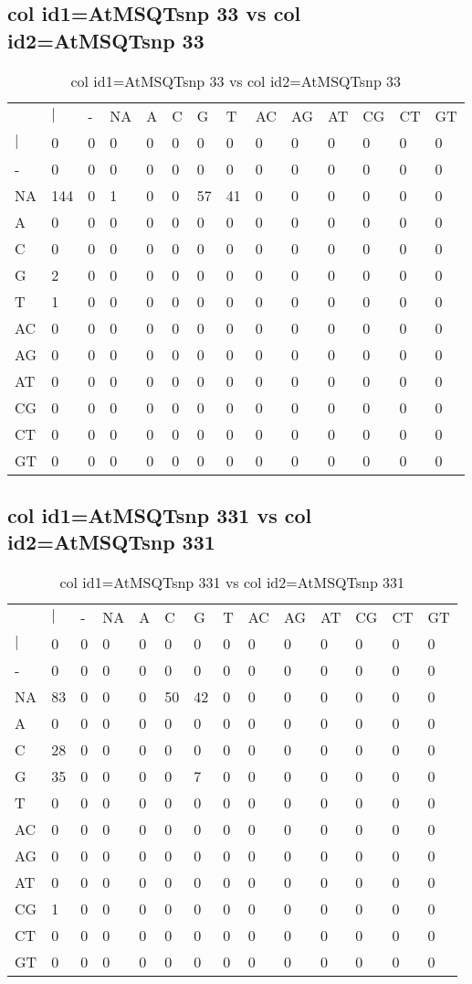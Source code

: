 \subsection{col id1=AtMSQTsnp 33 vs col id2=AtMSQTsnp 33}
\begin{center}
\begin{longtable}{|l|l|l|l|l|l|l|l|l|l|l|l|l|l|}
\caption{col id1=AtMSQTsnp 33 vs col id2=AtMSQTsnp 33} \label{table_dm670}\\
\hline
\\
\hline
&$|$&-&NA&A&C&G&T&AC&AG&AT&CG&CT&GT\\
$|$&0&0&0&0&0&0&0&0&0&0&0&0&0\\
-&0&0&0&0&0&0&0&0&0&0&0&0&0\\
NA&144&0&1&0&0&57&41&0&0&0&0&0&0\\
A&0&0&0&0&0&0&0&0&0&0&0&0&0\\
C&0&0&0&0&0&0&0&0&0&0&0&0&0\\
G&2&0&0&0&0&0&0&0&0&0&0&0&0\\
T&1&0&0&0&0&0&0&0&0&0&0&0&0\\
AC&0&0&0&0&0&0&0&0&0&0&0&0&0\\
AG&0&0&0&0&0&0&0&0&0&0&0&0&0\\
AT&0&0&0&0&0&0&0&0&0&0&0&0&0\\
CG&0&0&0&0&0&0&0&0&0&0&0&0&0\\
CT&0&0&0&0&0&0&0&0&0&0&0&0&0\\
GT&0&0&0&0&0&0&0&0&0&0&0&0&0\\
\hline
\end{longtable}
\end{center}

\subsection{col id1=AtMSQTsnp 331 vs col id2=AtMSQTsnp 331}
\begin{center}
\begin{longtable}{|l|l|l|l|l|l|l|l|l|l|l|l|l|l|}
\caption{col id1=AtMSQTsnp 331 vs col id2=AtMSQTsnp 331} \label{table_dm672}\\
\hline
\\
\hline
&$|$&-&NA&A&C&G&T&AC&AG&AT&CG&CT&GT\\
$|$&0&0&0&0&0&0&0&0&0&0&0&0&0\\
-&0&0&0&0&0&0&0&0&0&0&0&0&0\\
NA&83&0&0&0&50&42&0&0&0&0&0&0&0\\
A&0&0&0&0&0&0&0&0&0&0&0&0&0\\
C&28&0&0&0&0&0&0&0&0&0&0&0&0\\
G&35&0&0&0&0&7&0&0&0&0&0&0&0\\
T&0&0&0&0&0&0&0&0&0&0&0&0&0\\
AC&0&0&0&0&0&0&0&0&0&0&0&0&0\\
AG&0&0&0&0&0&0&0&0&0&0&0&0&0\\
AT&0&0&0&0&0&0&0&0&0&0&0&0&0\\
CG&1&0&0&0&0&0&0&0&0&0&0&0&0\\
CT&0&0&0&0&0&0&0&0&0&0&0&0&0\\
GT&0&0&0&0&0&0&0&0&0&0&0&0&0\\
\hline
\end{longtable}
\end{center}

